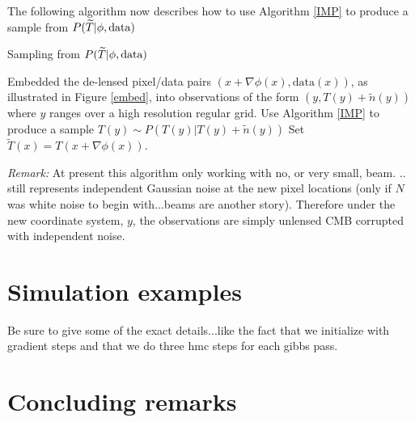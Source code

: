 \documentclass[noinfoline]{imsart}
\begin{document}

The following algorithm now describes how to use Algorithm \ref{IMP} to produce a sample from $ P(\widetilde T |  \phi,\text{\rm data})$

\begin{algorithm}[H]
\small
\caption{Sampling from $P(\widetilde T |  \phi,\text{\rm data})$}
\label{ith step of HMC}
\begin{algorithmic}[1]
\State Embedded the de-lensed pixel/data pairs  $(x+\nabla\phi(x), \text{data}(x))$, as illustrated in Figure \ref{embed}, into observations of the form $(y, T(y)+\tilde n(y))$ where $y$ ranges over a high resolution regular grid.
\State Use Algorithm \ref{IMP} to produce a sample $T(y)\sim P(T(y)| T(y)+\tilde n(y))$
\State Set $\widetilde T(x) = T(x+\nabla\phi(x))$.
\end{algorithmic}
\end{algorithm}




{\em Remark:} At present this algorithm only working with no, or very small, beam. ..
 still represents independent Gaussian noise at the new pixel locations (only if $N$ was white noise to begin with...beams are another story). Therefore under the new coordinate system, $y$, the observations are simply unlensed CMB  corrupted with independent noise.
 






%
%
\section{Simulation examples}
\label{Section: simulation examples}


Be sure to give some of the exact details...like the fact that we initialize with gradient steps and that we do three hmc steps for each gibbs pass.

%
%
\section{Concluding remarks}
\end{document}
